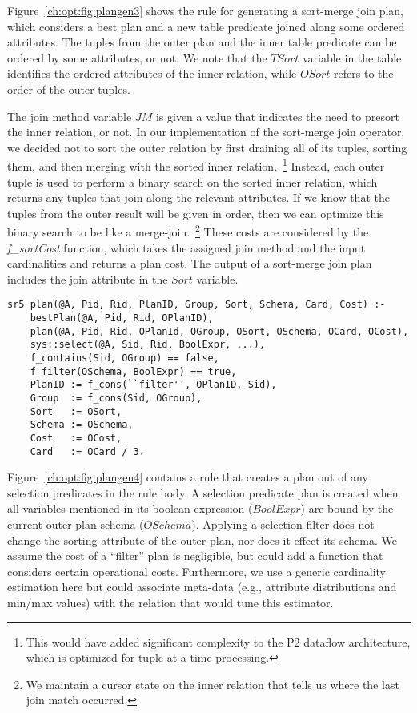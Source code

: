 Figure~\ref{ch:opt:fig:plangen3} shows the rule for generating a sort-merge
join plan, which considers a best plan and a new table predicate joined along
some ordered attributes.  The tuples from the outer plan and the inner table
predicate can be ordered by some attributes, or not.  We note that the $TSort$
variable in the  table identifies the ordered attributes of the
inner relation, while $OSort$ refers to the order of the outer tuples.  

The join method variable $JM$ is given a value that indicates the need to
presort the inner relation, or not.  In our implementation of the sort-merge
join operator, we decided not to sort the outer relation by first draining all
of its tuples, sorting them, and then merging with the sorted inner
relation.~\footnote{This would have added significant complexity to the P2
dataflow architecture, which is optimized for tuple at a time processing.}
Instead, each outer tuple is used to perform a binary search on the sorted
inner relation, which returns any tuples that join along the relevant
attributes.  If we know that the tuples from the outer result will be given in
order, then we can optimize this binary search to be like a
merge-join.~\footnote{We maintain a cursor state on the inner relation that
tells us where the last join match occurred.} These costs are considered by the
{\em f\_sortCost} function, which takes the assigned join method and the input
cardinalities and returns a plan cost.  The output of a sort-merge join plan
includes the join attribute in the $Sort$ variable.

\begin{figure*}
\ssp
\centering
\begin{lstlisting}
sr5 plan(@A, Pid, Rid, PlanID, Group, Sort, Schema, Card, Cost) :-
    bestPlan(@A, Pid, Rid, OPlanID),
    plan(@A, Pid, Rid, OPlanId, OGroup, OSort, OSchema, OCard, OCost),
    sys::select(@A, Sid, Rid, BoolExpr, ...),
    f_contains(Sid, OGroup) == false,
    f_filter(OSchema, BoolExpr) == true,
    PlanID := f_cons(``filter'', OPlanID, Sid),
    Group  := f_cons(Sid, OGroup),
    Sort   := OSort,
    Schema := OSchema,
    Cost   := OCost,
    Card   := OCard / 3.
\end{lstlisting}
\caption{\label{ch:opt:fig:plangen4}selection predicate filter plan.}
\end{figure*}

Figure~\ref{ch:opt:fig:plangen4} contains a rule that creates a plan out of any
selection predicates in the rule body.  A selection predicate plan is created
when all variables mentioned in its boolean expression ($BoolExpr$) are bound
by the current outer plan schema ($OSchema$).  Applying a selection filter does
not change the sorting attribute of the outer plan, nor does it effect its
schema.  We assume the cost of a ``filter'' plan is negligible, but could
add a function that considers certain operational costs.  Furthermore,
we use a generic cardinality estimation here but could associate meta-data
(e.g., attribute distributions and min/max values) with the  relation
that would tune this estimator.

